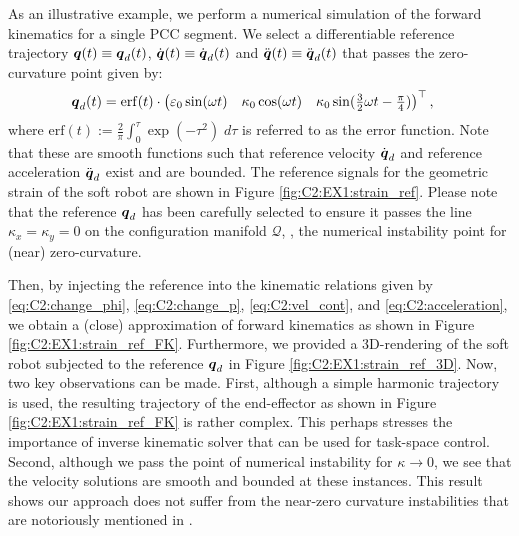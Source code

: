\begin{example}
As an illustrative example, we perform a numerical simulation of the forward kinematics for a single PCC segment. We select a differentiable reference trajectory ${\boldsymbol{q}}(t) \equiv {\boldsymbol{q}}_d(t)$, $\dot{{\boldsymbol{q}}}(t) \equiv \dot{{\boldsymbol{q}}}_d(t)$ and $\ddot{{\boldsymbol{q}}}(t) \equiv \ddot{{\boldsymbol{q}}}_d(t)$ that passes the zero-curvature point given by:
%
\begin{align*}
{\boldsymbol{q}}_d(t) &  =  \textup{\textrm{erf}}(t) \cdot \begin{pmatrix} \varepsilon_0 \sin(\omega t) & \kappa_0 \cos(\omega t) & \kappa_0 \sin(\tfrac{3}{2}\omega t - \tfrac{\pi}{4}) \end{pmatrix}^\top,
\end{align*}
%
where $\textrm{erf}(t) := \frac{2}{\pi}\int_0^\tau \exp(-\tau^2) \; d\tau$ is referred to as the error function. Note that these are smooth functions such that reference velocity ${\dot{\boldsymbol{q}}}_d$ and reference acceleration ${\ddot{\boldsymbol{q}}}_d$ exist and are bounded. The reference signals for the geometric strain of the soft robot are shown in Figure \ref{fig:C2:EX1:strain_ref}. Please note that the reference ${\boldsymbol{q}}_d$ has been carefully selected to ensure it passes the line $\kappa_x = \kappa_y = 0$ on the configuration manifold
$\mathcal{Q}$, \ie, the numerical instability point for (near) zero-curvature.
%

Then, by injecting the reference into the kinematic relations given by \eqref{eq:C2:change_phi}, \eqref{eq:C2:change_p}, \eqref{eq:C2:vel_cont}, and \eqref{eq:C2:acceleration}, we obtain a (close) approximation of forward kinematics as shown in Figure
\ref{fig:C2:EX1:strain_ref_FK}. Furthermore, we provided a 3D-rendering of the soft robot subjected to the reference ${\boldsymbol{q}}_d$ in Figure \ref{fig:C2:EX1:strain_ref_3D}. Now, two key observations can be made. First, although a simple harmonic trajectory is used, the resulting trajectory of the end-effector as shown in Figure \ref{fig:C2:EX1:strain_ref_FK} is rather complex. This perhaps stresses the importance of inverse kinematic solver that can be used for task-space control. Second, although we pass the point of numerical instability for $\kappa \to 0$, we see that the velocity solutions are smooth and bounded at these instances. This result shows our approach does not suffer from the near-zero curvature instabilities that are notoriously mentioned in \cite{Falkenhahn2015,DellaSantina2020}. 
\end{example}
\vfill
